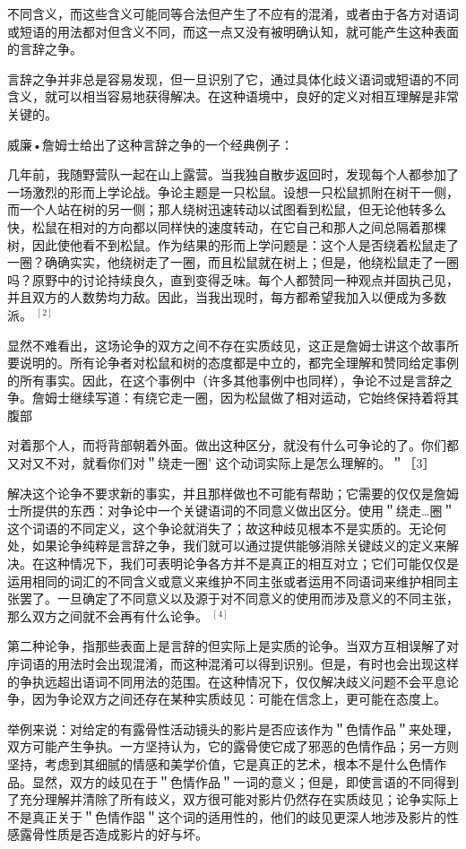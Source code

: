不同含义，而这些含义可能同等合法但产生了不应有的混淆，或者由于各方对语词或短语的用法都对但含义不同，而这一点又没有被明确认知，就可能产生这种表面的言辞之争。

言辞之争并非总是容易发现，但一旦识别了它，通过具体化歧义语词或短语的不同含义，就可以相当容易地获得解决。在这种语境中，良好的定义对相互理解是非常关键的。

威廉•詹姆士给出了这种言辞之争的一个经典例子：

几年前，我随野营队一起在山上露营。当我独自散步返回时，发现每个人都参加了一场激烈的形而上学论战。争论主题是一只松鼠。设想一只松鼠抓附在树干一侧，而一个人站在树的另一侧；那人绕树迅速转动以试图看到松鼠，但无论他转多么快，松鼠在相对的方向都以同样快的速度转动，在它自己和那人之间总隔着那棵树，因此使他看不到松鼠。作为结果的形而上学问题是：这个人是否绕着松鼠走了一圈？确确实实，他绕树走了一圈，而且松鼠就在树上；但是，他绕松鼠走了一圈吗？原野中的讨论持续良久，直到变得乏味。每个人都赞同一种观点并固执己见，并且双方的人数势均力敌。因此，当我出现时，每方都希望我加入以便成为多数派。 ${ }^{[2]}$

显然不难看出，这场论争的双方之间不存在实质歧见，这正是詹姆士讲这个故事所要说明的。所有论争者对松鼠和树的态度都是中立的，都完全理解和赞同给定事例的所有事实。因此，在这个事例中（许多其他事例中也同样），争论不过是言辞之争。詹姆士继续写道：有绕它走一圈，因为松鼠做了相对运动，它始终保持着将其腹部

对着那个人，而将背部朝着外面。做出这种区分，就没有什么可争论的了。你们都又对又不对，就看你们对＂绕走一圈’ 这个动词实际上是怎么理解的。＂［3］

解决这个论争不要求新的事实，并且那样做也不可能有帮助；它需要的仅仅是詹姆士所提供的东西：对争论中一个关键语词的不同意义做出区分。使用＂绕走…圈＂这个词语的不同定义，这个争论就消失了；故这种歧见根本不是实质的。无论何处，如果论争纯粹是言辞之争，我们就可以通过提供能够消除关键歧义的定义来解决。在这种情况下，我们可表明论争各方并不是真正的相互对立；它们可能仅仅是运用相同的词汇的不同含义或意义来维护不同主张或者运用不同语词来维护相同主张罢了。一旦确定了不同意义以及源于对不同意义的使用而涉及意义的不同主张，那么双方之间就不会再有什么论争。 ${ }^{[4]}$

第二种论争，指那些表面上是言辞的但实际上是实质的论争。当双方互相误解了对㡰词语的用法时会出现混淆，而这种混淆可以得到识别。但是，有时也会出现这样的争执远超出语词不同用法的范围。在这种情况下，仅仅解决歧义问题不会平息论争，因为争论双方之间还存在某种实质歧见：可能在信念上，更可能在态度上。

举例来说：对给定的有露骨性活动镜头的影片是否应该作为＂色情作品＂来处理，双方可能产生争执。一方坚持认为，它的露骨使它成了邪恶的色情作品；另一方则坚持，考虑到其细腻的情感和美学价值，它是真正的艺术，根本不是什么色情作品。显然，双方的歧见在于＂色情作品＂一词的意义；但是，即使言语的不同得到了充分理解并清除了所有歧义，双方很可能对影片仍然存在实质歧见；论争实际上不是真正关于＂色情作㗊＂这个词的适用性的，他们的歧见更深人地涉及影片的性感露骨性质是否造成影片的好与坏。

